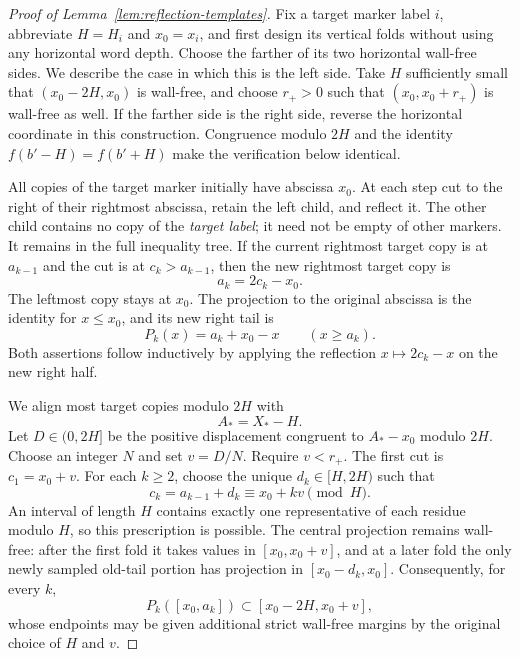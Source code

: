 \begin{proof}[Proof of Lemma~\ref{lem:reflection-templates}]
Fix a target marker label $i$, abbreviate $H=H_i$ and $x_0=x_i$,
and first design its vertical folds without using any horizontal
word depth. Choose the farther of its two horizontal wall-free
sides. We describe the case in which this is the left side. Take
$H$ sufficiently small that $(x_0-2H,x_0)$ is wall-free, and choose
$r_+>0$ such that $(x_0,x_0+r_+)$ is wall-free as well. If the
farther side is the right side, reverse the horizontal coordinate
in this construction. Congruence modulo $2H$ and the identity
$f(b'-H)=f(b'+H)$ make the verification below identical.

All copies of the target marker initially have abscissa $x_0$.
At each step cut to the right of their rightmost abscissa, retain
the left child, and reflect it. The other child contains no copy
of the \emph{target label}; it need not be empty of other markers.
It remains in the full inequality tree. If the current rightmost
target copy is at $a_{k-1}$ and the cut is at $c_k>a_{k-1}$, then
the new rightmost target copy is
\begin{equation}
 a_k=2c_k-x_0.
 \label{calc:abscissa-maximum}
\end{equation}
The leftmost copy stays at $x_0$. The projection to the original
abscissa is the identity for $x\le x_0$, and its new right tail is
\begin{equation}
 P_k(x)=a_k+x_0-x\qquad(x\ge a_k).
 \label{calc:abscissa-tail}
\end{equation}
Both assertions follow inductively by applying the reflection
$x\mapsto2c_k-x$ on the new right half.

We align most target copies modulo $2H$ with
\[
 A_*=X_*-H.
\]
Let $D\in(0,2H]$ be the positive displacement congruent to
$A_*-x_0$ modulo $2H$. Choose an integer $N$ and set $v=D/N$.
Require $v<r_+$. The first cut is $c_1=x_0+v$. For each $k\ge2$,
choose the unique $d_k\in[H,2H)$ such that
\begin{equation}
 c_k=a_{k-1}+d_k\equiv x_0+kv\pmod H.
 \label{calc:abscissa-cuts}
\end{equation}
An interval of length $H$ contains exactly one representative of
each residue modulo $H$, so this prescription is possible. The
central projection remains wall-free: after the first fold it
takes values in $[x_0,x_0+v]$, and at a later fold the only newly
sampled old-tail portion has projection in $[x_0-d_k,x_0]$.
Consequently, for every $k$,
\begin{equation}
 P_k([x_0,a_k])\subset[x_0-2H,x_0+v],
 \label{calc:abscissa-central}
\end{equation}
whose endpoints may be given additional strict wall-free margins
by the original choice of $H$ and $v$.


\end{proof}
